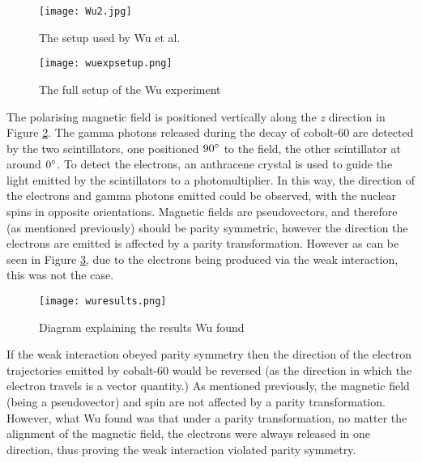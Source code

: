 \documentclass[11pt,oneside,a4paper]{article}
\begin{document}
\begin{figure}
		\centering
		\captionsetup{justification=centering}
		\texttt{[image: Wu2.jpg]}
		\caption{The setup used by Wu et al.}
		\label{fig:wuexpsetup}
\end{figure}

\begin{figure}
		\centering
		\captionsetup{justification=centering}
		\texttt{[image: wuexpsetup.png]}
		\caption{The full setup of the Wu experiment}
		\label{fig:wuexpsetup2}
\end{figure}


The polarising magnetic field is positioned vertically along the \textit{z} direction in Figure \ref{fig:wuexpsetup2}. The gamma photons released during the decay of cobolt-60 are detected by the two scintillators, one positioned $90\degree$ to the field, the other scintillator at around $0\degree$. To detect the electrons, an anthracene crystal is used to guide the light emitted by the scintillators to a photomultiplier. In this way, the direction of the electrons and gamma photons emitted could be observed, with the nuclear spins in opposite orientations. Magnetic fields are pseudovectors, and therefore (as mentioned previously) should be parity symmetric, however the direction the electrons are emitted is affected by a parity transformation. However as can be seen in Figure \ref{fig:wuresults}, due to the electrons being produced via the weak interaction, this was not the case.

\begin{figure}[htbp]
	\centering
	\texttt{[image: wuresults.png]}
	\captionsetup{justification=centering}
	\caption{Diagram explaining the results Wu found}
	\label{fig:wuresults}
\end{figure}

If the weak interaction obeyed parity symmetry then the direction of the electron trajectories emitted by cobalt-60 would be reversed (as the direction in which the electron travels is a vector quantity.) As mentioned previously, the magnetic field (being a pseudovector) and spin are not affected by a parity transformation. However, what Wu found was that under a parity transformation, no matter the alignment of the magnetic field, the electrons were always released in one direction, thus proving the weak interaction violated parity symmetry.

 
\end{document}
